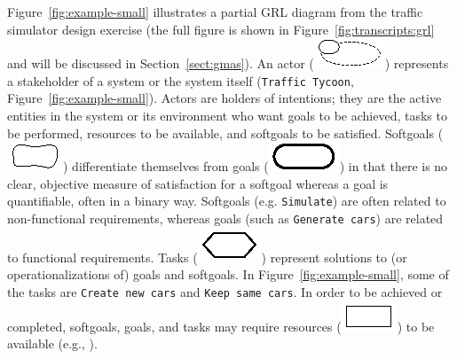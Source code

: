 Figure~\ref{fig:example-small} illustrates a partial GRL diagram from the traffic simulator design exercise (the full figure is shown in Figure~\ref{fig:transcripts:grl} and will be discussed in Section~\ref{sect:gmas}). An actor (\includegraphics[scale=1]{img/actor}) represents a stakeholder of a system or the system itself (\texttt{Traffic Tycoon}, Figure~\ref{fig:example-small}). Actors are holders of intentions; they are the active entities in the system or its environment who want goals to be achieved, tasks to be performed, resources to be available, and softgoals to be satisfied. Softgoals (\includegraphics[scale=1]{img/softgoal}) differentiate themselves from goals (\includegraphics[scale=1]{img/goal}) in that there is no clear, objective measure of satisfaction for a softgoal whereas a goal is quantifiable, often in a binary way. Softgoals (e.g. \texttt{Simulate}) are often related to non-functional requirements, whereas goals (such as  \texttt{Generate cars}) are related to functional requirements. Tasks (\includegraphics[scale=1]{img/task}) represent solutions to (or operationalizations of) goals and softgoals. In Figure~\ref{fig:example-small}, some of the tasks are  \texttt{Create new cars} and \texttt{Keep same cars}. In order to be achieved or completed, softgoals, goals, and tasks may require resources (\includegraphics[scale=1]{img/resource}) to be available (e.g., ).

